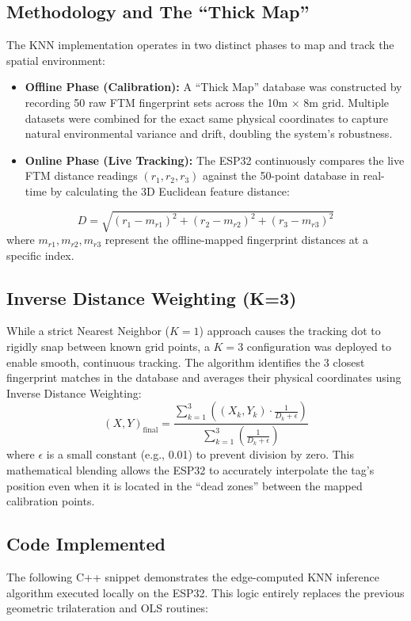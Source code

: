 \documentclass[conference]{IEEEtran}
\begin{document}
\subsection{Methodology and The ``Thick Map''}
The KNN implementation operates in two distinct phases to map and track the spatial environment:
\begin{itemize}
    \item \textbf{Offline Phase (Calibration):} A ``Thick Map'' database was constructed by recording 50 raw FTM fingerprint sets across the 10m $\times$ 8m grid. Multiple datasets were combined for the exact same physical coordinates to capture natural environmental variance and drift, doubling the system's robustness.
    \item \textbf{Online Phase (Live Tracking):} The ESP32 continuously compares the live FTM distance readings $(r_1, r_2, r_3)$ against the 50-point database in real-time by calculating the 3D Euclidean feature distance:
\end{itemize}
\begin{equation}
    D = \sqrt{(r_1 - m_{r1})^2 + (r_2 - m_{r2})^2 + (r_3 - m_{r3})^2}
\end{equation}
where $m_{r1}, m_{r2}, m_{r3}$ represent the offline-mapped fingerprint distances at a specific index.

\subsection{Inverse Distance Weighting (K=3)}
While a strict Nearest Neighbor ($K=1$) approach causes the tracking dot to rigidly snap between known grid points, a $K=3$ configuration was deployed to enable smooth, continuous tracking. The algorithm identifies the 3 closest fingerprint matches in the database and averages their physical coordinates using Inverse Distance Weighting:
\begin{equation}
    (X, Y)_{\text{final}} = \frac{\sum_{k=1}^{3} \left( (X_k, Y_k) \cdot \frac{1}{D_k + \epsilon} \right)}{\sum_{k=1}^{3} \left(\frac{1}{D_k + \epsilon}\right)}
\end{equation}
where $\epsilon$ is a small constant (e.g., 0.01) to prevent division by zero. This mathematical blending allows the ESP32 to accurately interpolate the tag's position even when it is located in the ``dead zones'' between the mapped calibration points.

\subsection{Code Implemented}
The following C++ snippet demonstrates the edge-computed KNN inference algorithm executed locally on the ESP32. This logic entirely replaces the previous geometric trilateration and OLS routines:
\end{document}
